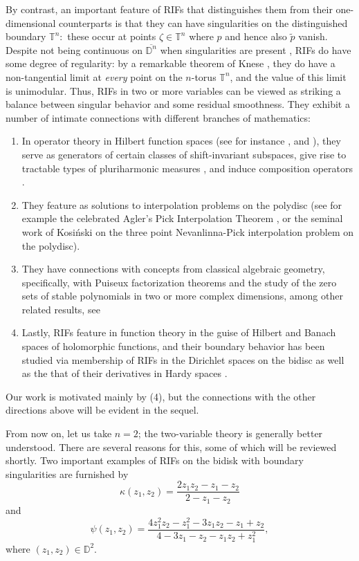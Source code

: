 \documentclass[11pt]{amsart}
\numberwithin{equation}{section}
\begin{document}
By contrast, an important feature of RIFs that distinguishes them from their one-dimensional counterparts is that they can have singularities on the distinguished boundary $\mathbb{T}^n:$
these occur at points $\zeta \in \mathbb{T}^n$ where $p$ and hence also $\tilde{p}$ vanish. Despite not being continuous on $\overline{\mathbb{D}^n}$ when singularities are present \cite{Pas17}, RIFs do have some degree of regularity: by a remarkable theorem of Knese \cite[Theorem C]{Knese2}, they do have a non-tangential limit at {\it every} point on the $n$-torus $\mathbb{T}^n$, and the value of this limit is unimodular. Thus, RIFs in two or more variables can be viewed as striking a balance between singular behavior and some residual smoothness. They exhibit a number of intimate connections with different branches of mathematics: 
\begin{enumerate}
\item  In operator theory in Hilbert function spaces (see for instance \cite{AMY}, \cite{Knese1} and \cite{Hilbert1}), they serve as generators of certain classes of shift-invariant subspaces, give rise to tractable types of pluriharmonic measures \cite{ClarkMeasures1,CLARK 2}, and induce composition operators \cite{Me}. 
\item They feature as solutions to interpolation problems on the polydisc (see for example the celebrated Agler's Pick Interpolation Theorem \cite{AMY}, or the seminal work of Kosi\'nski  \cite{Lukasz} on the three point Nevanlinna-Pick interpolation problem on the polydisc).
\item They have connections with concepts from classical algebraic geometry, specifically, with Puiseux factorization theorems and the study of the zero sets of stable polynomials in two or more complex dimensions, among other related results, see \cite{Pisa, Polonici, AJM}
\item Lastly, RIFs feature in function theory in the guise of Hilbert and Banach spaces of holomorphic functions, and their boundary behavior has been studied via membership of RIFs in the Dirichlet spaces on the bidisc as well as the that of their derivatives in Hardy spaces \cite{PLMS, AJM,Bergqvist}. 

\end{enumerate}
Our work is motivated mainly by (4), but the connections with the other directions above will be evident in the sequel. 

From now on, let us take $n=2$; the two-variable theory is generally better understood. There are several reasons for this, some of which will be reviewed shortly. Two important examples of RIFs on the bidisk with boundary singularities are furnished by
$$\kappa(z_1,z_2)=\frac{2z_1z_2-z_1-z_2}{2-z_1-z_2}$$
and
$$\psi(z_1,z_2)=\frac{4z_1^2z_2-z_1^2-3z_1z_2-z_1+z_2}{4-3z_1-z_2-z_1z_2+z_1^2},$$
where $(z_1,z_2)\in\mathbb{D}^2.$
\end{document}
